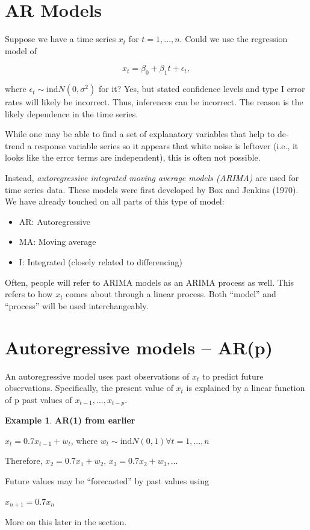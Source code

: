 \documentclass[
]{book}
\providecommand{\tightlist}{%
  \setlength{\itemsep}{0pt}\setlength{\parskip}{0pt}}
\theoremstyle{definition}
\theoremstyle{definition}
\newtheorem{example}{Example}[chapter]
\theoremstyle{definition}
\theoremstyle{definition}
\theoremstyle{remark}
\begin{document}
\hypertarget{ar-models}{%
\section{AR Models}\label{ar-models}}

Suppose we have a time series \(x_t\) for \(t = 1, …, n.\) Could we use the regression model of

\[x_t = \beta_0 + \beta_1t + \epsilon_t, \]

where \(\epsilon_t \sim \mathrm{ind} N(0,\sigma^2)\) for it? Yes, but stated confidence levels and type I error rates will likely be incorrect. Thus, inferences can be incorrect. The reason is the likely dependence in the time series.

While one may be able to find a set of explanatory variables that help to de-trend a response variable series so it appears that white noise is leftover (i.e., it looks like the error terms are independent), this is often not possible.

Instead, \emph{autoregressive integrated moving average models (ARIMA)} are used for time series data. These models were first developed by Box and Jenkins (1970). We have already touched on all parts of this type of model:

\begin{itemize}
\tightlist
\item
  AR: Autoregressive
\item
  MA: Moving average
\item
  I: Integrated (closely related to differencing)
\end{itemize}

Often, people will refer to ARIMA models as an ARIMA process as well. This refers to how \(x_t\) comes about through a linear process. Both ``model'' and ``process'' will be used interchangeably.

\hypertarget{autoregressive-models-arp}{%
\section{Autoregressive models -- AR(p)}\label{autoregressive-models-arp}}

An autoregressive model uses past observations of \(x_t\) to predict future observations. Specifically, the present value of \(x_t\) is explained by a linear function of p past values of \(x_{t-1}, …, x_{t-p}.\)

\begin{example}
\textbf{AR(1) from earlier}

\(x_t=0.7x_{t-1}+w_t\), where \(w_t \sim \mathrm{ind}N(0,1)\forall t=1,...,n\)

Therefore, \(x_2=0.7x_1+w_2\), \(x_3=0.7x_2+w_3,...\)

Future values may be ``forecasted'' by past values using

\(x_{n+1} = 0.7x_n\)

More on this later in the section.
\end{example}
\end{document}

